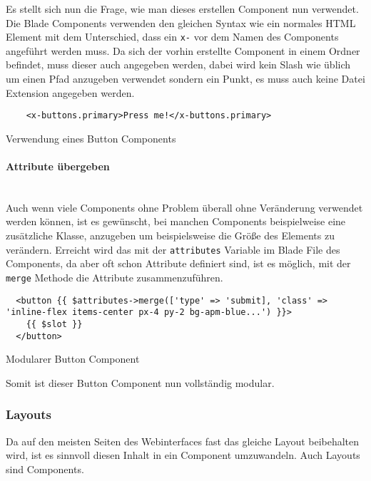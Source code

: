 Es stellt sich nun die Frage, wie man dieses erstellen Component nun verwendet.
Die Blade Components verwenden den gleichen Syntax wie ein normales HTML
Element mit dem Unterschied, dass ein \verb|x-| vor dem Namen des Components
angeführt werden muss. Da sich der vorhin erstellte Component in einem Ordner befindet, muss dieser auch
angegeben werden, dabei wird kein Slash wie üblich um einen Pfad anzugeben
verwendet sondern ein Punkt, es muss auch keine Datei Extension angegeben werden.

\begin{listing}[H]
  \begin{verbatim}
    <x-buttons.primary>Press me!</x-buttons.primary>
  \end{verbatim}
  \caption{Verwendung eines Button Components}
\end{listing}

\paragraph{Attribute übergeben}\mbox{}\\

Auch wenn viele Components ohne Problem überall ohne Veränderung verwendet
werden können, ist es gewünscht, bei manchen Components beispielweise eine
zusätzliche Klasse, anzugeben um beispielsweise die Größe des Elements zu verändern. Erreicht
wird das mit der \verb|attributes| Variable im Blade File des Components, da
aber oft schon Attribute definiert sind, ist es möglich, mit der \verb|merge|
Methode die Attribute zusammenzuführen.

\begin{listing}[H]
  \begin{verbatim}
  <button {{ $attributes->merge(['type' => 'submit], 'class' => 'inline-flex items-center px-4 py-2 bg-apm-blue...') }}>
    {{ $slot }}
  </button>
  \end{verbatim}
  \caption{Modularer Button Component}
\end{listing}

Somit ist dieser Button Component nun vollständig modular.

\subsubsection{Layouts}

Da auf den meisten Seiten des Webinterfaces fast das gleiche Layout beibehalten
wird, ist es sinnvoll diesen Inhalt in ein Component umzuwandeln. Auch Layouts sind
Components.\\

